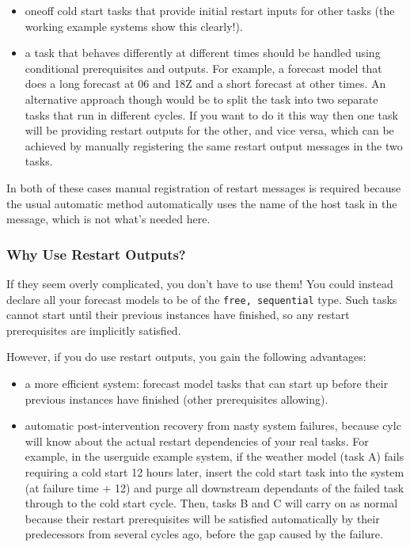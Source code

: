 \documentclass[11pt,a4paper]{article}
\begin{document}
\begin{itemize}

    \item oneoff cold start tasks that provide initial restart inputs
        for other tasks (the working example systems show this clearly!).

    \item a task that behaves differently at different times should be 
        handled using conditional prerequisites and outputs. For
        example, a forecast model that does a long forecast at 06 and
        18Z and a short forecast at other times. An alternative approach
        though would be to split the task into two separate tasks that 
        run in different cycles. If you want to do it this way then one
        task will be providing restart outputs for the other, and vice
        versa, which can be achieved by manually registering the same
        restart output messages in the two tasks. 

\end{itemize}

In both of these cases manual registration of restart messages is
required because the usual automatic method automatically uses the name
of the host task in the message, which is not what's needed here.


\subsubsection{Why Use Restart Outputs?}

If they seem overly complicated, you don't have to use them! You could
instead declare all your forecast models to be of the  
\lstinline=free, sequential= type. Such tasks cannot start until their
previous instances have finished, so any restart prerequisites are
implicitly satisfied.

However, if you do use restart outputs, you gain the following advantages:

\begin{itemize}

    \item a more efficient system: forecast model tasks that can start
        up before their previous instances have finished (other
        prerequisites allowing).  
    
    \item automatic post-intervention recovery from nasty system
        failures, because cylc will know about the actual restart
        dependencies of your real tasks. For example, in the userguide
        example system, if the weather model (task A) fails requiring a
        cold start 12 hours later, insert the cold start task into the
        system (at failure time + 12) and purge all downstream dependants of 
        the failed task through to the cold start cycle. Then, tasks
        B and C will carry on as normal because their restart
        prerequisites will be satisfied automatically by their
        predecessors from several cycles ago, before the gap caused by
        the failure.

\end{itemize}
\end{document}

